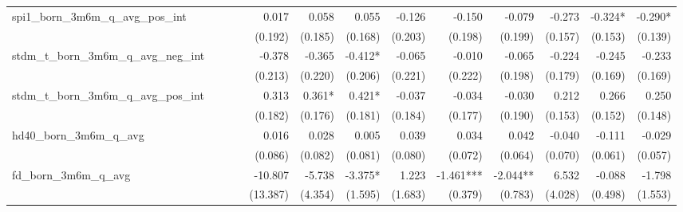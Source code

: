 \begin{tabular}{lrrrrrrrrrrrr}
spi1\_born\_3m6m\_q\_avg\_pos\_int          &              &              &              &        0.017 &        0.058 &        0.055 &       -0.126 &       -0.150 &       -0.079 &       -0.273 &      -0.324* &      -0.290* \\ 
                                            &              &              &              &      (0.192) &      (0.185) &      (0.168) &      (0.203) &      (0.198) &      (0.199) &      (0.157) &      (0.153) &      (0.139) \\ 
stdm\_t\_born\_3m6m\_q\_avg\_neg\_int       &              &              &              &       -0.378 &       -0.365 &      -0.412* &       -0.065 &       -0.010 &       -0.065 &       -0.224 &       -0.245 &       -0.233 \\ 
                                            &              &              &              &      (0.213) &      (0.220) &      (0.206) &      (0.221) &      (0.222) &      (0.198) &      (0.179) &      (0.169) &      (0.169) \\ 
stdm\_t\_born\_3m6m\_q\_avg\_pos\_int       &              &              &              &        0.313 &       0.361* &       0.421* &       -0.037 &       -0.034 &       -0.030 &        0.212 &        0.266 &        0.250 \\ 
                                            &              &              &              &      (0.182) &      (0.176) &      (0.181) &      (0.184) &      (0.177) &      (0.190) &      (0.153) &      (0.152) &      (0.148) \\ 
hd40\_born\_3m6m\_q\_avg                    &              &              &              &        0.016 &        0.028 &        0.005 &        0.039 &        0.034 &        0.042 &       -0.040 &       -0.111 &       -0.029 \\ 
                                            &              &              &              &      (0.086) &      (0.082) &      (0.081) &      (0.080) &      (0.072) &      (0.064) &      (0.070) &      (0.061) &      (0.057) \\ 
fd\_born\_3m6m\_q\_avg                      &              &              &              &      -10.807 &       -5.738 &      -3.375* &        1.223 &    -1.461*** &     -2.044** &        6.532 &       -0.088 &       -1.798 \\ 
                                            &              &              &              &     (13.387) &      (4.354) &      (1.595) &      (1.683) &      (0.379) &      (0.783) &      (4.028) &      (0.498) &      (1.553) \\ 

\end{tabular}
